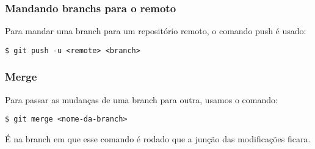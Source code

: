 \documentclass[brazil]{beamer}
\begin{document}
\begin{frame}[fragile]
  \frametitle{Mandando branchs para o remoto}
  Para mandar uma branch para um repositório remoto, o comando push é usado:
  \begin{block}{}
    \verb#$ git push -u <remote> <branch>#
  \end{block}
\end{frame}

\begin{frame}[fragile]
  \frametitle{Merge}
  Para passar as mudanças de uma branch para outra, usamos o comando:
  \begin{block}{}
    \verb#$ git merge <nome-da-branch>#
  \end{block}
  É na branch em que esse comando é rodado que a junção das modificações ficara.
\end{frame}
\end{document}
